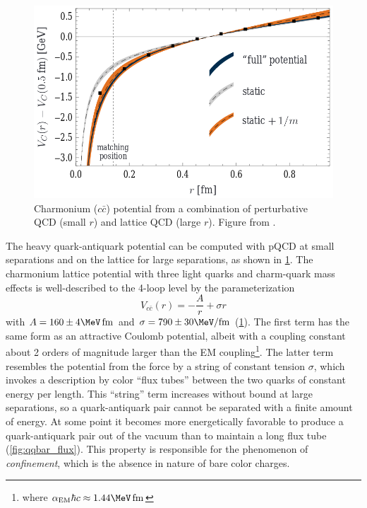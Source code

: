 \begin{figure}[t]
  \includegraphics{ccbar_potential.png}
  \caption{Charmonium ($c\bar{c}$) potential from a combination of perturbative QCD (small $r$) and lattice QCD (large $r$). Figure from .}
  \label{fig:charmonium_potential}
\end{figure}

The heavy quark-antiquark potential can be computed with \ac{pQCD} at small separations and on the lattice for large separations, as shown in \cref{fig:charmonium_potential}.
The charmonium lattice \qcd potential with three light quarks and charm-quark mass effects is well-described to the 4-loop level by the parameterization \cite{Laschka:2011zr}
\begin{equation}
V_{c\bar{c}}(r) = - \frac{A}{r} + \sigma r
\end{equation}
with $A = 160 \pm 4 \MeV\,\fm$ and $\sigma = 790 \pm 30 \MeV/\fm$ (\cref{fig:charmonium_potential}).
The first term has the same form as an attractive Coulomb potential, albeit with a coupling constant about 2 orders of magnitude larger than the \ac{EM} coupling\footnote{where $\alpha_\textrm{EM} \hbar c \approx 1.44 \MeV\,\fm$}.
The latter term resembles the potential from the force by a string of constant tension $\sigma$, which invokes a description by color ``flux tubes'' between the two quarks of constant energy per length.
This ``string'' term increases without bound at large separations, so a quark-antiquark pair cannot be separated with a finite amount of energy.
At some point it becomes more energetically favorable to produce a quark-antiquark pair out of the vacuum than to maintain a long flux tube (\cref{fig:qqbar_flux}).
This property is responsible for the phenomenon of \emph{confinement}, which is the absence in nature of bare color charges.

